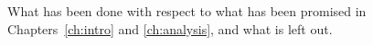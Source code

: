 What has been done with respect to what has been promised
in Chapters~\ref{ch:intro} and \ref{ch:analysis},
and what is left out.
